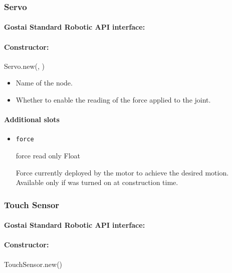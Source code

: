 \subsubsection{Servo}

\paragraph{Gostai Standard Robotic API interface:} 

\paragraph{Constructor:} Servo.new(, )

\begin{itemize}
\item {} Name of the \webots node.
\item {} Whether to enable the reading of the force
  applied to the joint.
\end{itemize}

\paragraph{Additional slots}

\begin{itemize}
\item \lstinline{force}
\begin{attribute}{force}
  {read only}
  {Float}
  {}


  Force currently deployed by the motor to achieve the desired
  motion. Available only if  was turned on at
  construction time.
\end{attribute}
\end{itemize}

\subsubsection{Touch Sensor}

\paragraph{Gostai Standard Robotic API interface:} 

\paragraph{Constructor:} TouchSensor.new()

